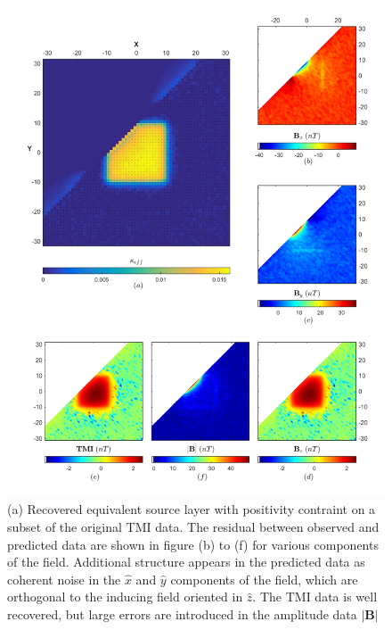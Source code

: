 \begin{figure}[h!]
\includegraphics[scale=0.60]{ES_Li_CornerOut}
\caption{(a) Recovered equivalent source layer with positivity contraint on a subset of the original TMI data. The residual between observed and predicted data are shown in figure (b) to (f) for various components of the field. Additional structure appears in the predicted data as coherent noise in the $\hat x$ and  $\hat y$ components of the field, which are orthogonal to the inducing field oriented in $\hat z$. The TMI data is well recovered, but large errors are introduced in the amplitude data $\mathbf{|B|}$ }
\label{fig:ES_Li_CornerOut}
\end{figure}

